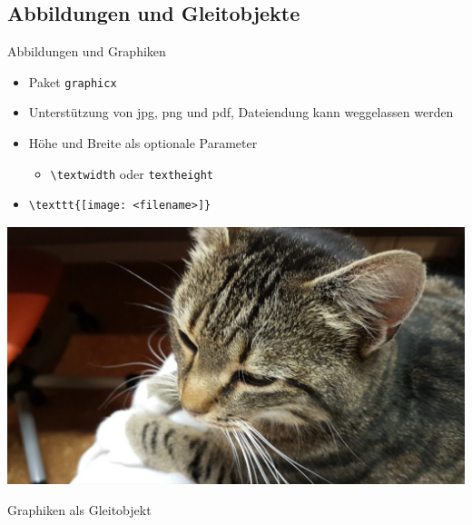 \documentclass[presentation,aspectratio=169]{beamer}
\begin{document}
\subsection{Abbildungen und Gleitobjekte}

\begin{frame}[fragile]{Abbildungen und Graphiken}
  \begin{itemize}
    \item Paket \verb|graphicx|
    \item Unterstützung von jpg, png und pdf, Dateiendung kann weggelassen werden
    \item Höhe und Breite als optionale Parameter
      \begin{itemize}
        \item \verb|\textwidth| oder \verb|textheight|
      \end{itemize}
    \item
      \begin{verbatim}
\texttt{[image: <filename>]}
      \end{verbatim}
  \end{itemize}
  \begin{center}
    \includegraphics[height=.5\textheight]{katze}
  \end{center}
\end{frame}

\begin{frame}{Graphiken als Gleitobjekt}
  \begin{columns}
    \begin{column}{.4\textwidth}
      
    \end{column}
    \begin{column}{.5\textwidth}
      \inputminted{latex}{codebeispiele/graphics-figure.tex}
    \end{column}
  \end{columns}
\end{frame}
\end{document}
